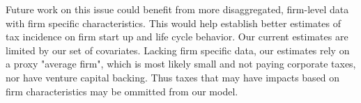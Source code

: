 Future work on this issue could benefit from more disaggregated, firm-level data with firm specific characteristics. This would help establish better estimates of tax incidence on firm start up and life cycle behavior. Our current estimates are limited by our set of covariates. Lacking firm specific data, our estimates rely on a proxy "average firm", which is most likely small and not paying corporate taxes, nor have venture capital backing. Thus taxes that may have impacts based on firm characteristics may be ommitted from our model.
